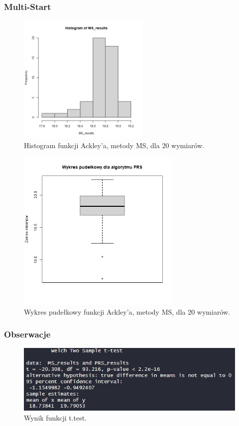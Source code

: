 \documentclass{lab}
\begin{document}
\subsubsection{Multi-Start}
\begin{figure}[H]
  \centering
  \includegraphics[width=0.56\textwidth]{img/dim20_MS_Ackley_his.png}
  \caption{Histogram funkcji Ackley'a, metody MS, dla 20 wymiarów.}
\end{figure}
\begin{figure}[H]
  \centering
  \includegraphics[width=0.7\textwidth]{img/dim20_MS_Ackley.png}
  \caption{Wykres pudełkowy funkcji Ackley'a, metody MS, dla 20 wymiarów.}
\end{figure}

\subsubsection{Obserwacje}
 \begin{figure}[H]
     \centering
     \includegraphics[width=0.9\linewidth]{img/T6.png}
     \caption{Wynik funkcji t.test.}
     \label{fig:enter-label}
 \end{figure}
\end{document}
